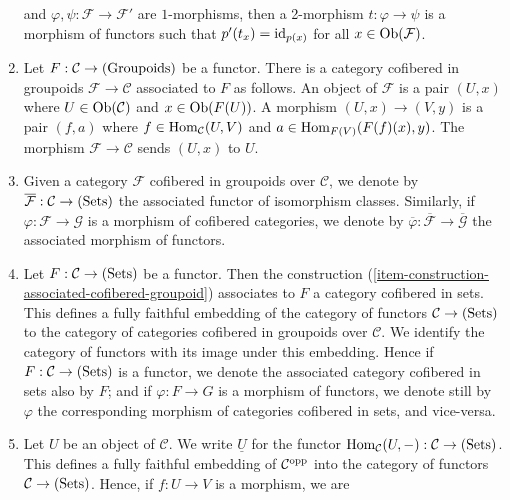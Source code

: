 \begin{remarks}
\begin{enumerate}
and $\varphi, \psi: \mathcal F \rightarrow \mathcal F'$ are $1$-morphisms, then 
a 2-morphism $t: \varphi \rightarrow \psi$ is a morphism of functors such that 
$p'(t_x) = \textnormal{id}_{p(x)}$ for all $x \in \textnormal{Ob}(\mathcal F)$.
\item
\label{item-construction-associated-cofibered-groupoid} 
Let $F: \mathcal C \rightarrow \textnormal{(Groupoids)}$ be a functor.  There 
is a category cofibered in groupoids $\mathcal F \rightarrow \mathcal C$ 
associated to $F$ as follows.  An object of $\mathcal F$ is a pair $(U,x)$ 
where $U \in \textnormal{Ob}(\mathcal C)$ and $x \in \textnormal{Ob}(F(U))$.  A 
morphism $(U,x) \rightarrow (V,y)$ is a pair $(f,a)$ where $f \in 
\textnormal{Hom}_{\mathcal C}(U,V)$ and $a \in 
\textnormal{Hom}_{F(V)}(F(f)(x),y)$.  The morphism $\mathcal F \rightarrow 
\mathcal C$ sends $(U,x)$ to $U$.
\item Given a category $\mathcal F$ cofibered in groupoids over $\mathcal C$, 
we denote by $\overline{\mathcal{F}} : \mathcal C \rightarrow 
\textnormal{(Sets)}$ the associated functor of isomorphism classes. Similarly, 
if $\varphi: \mathcal F \rightarrow \mathcal G$ is a morphism of cofibered 
categories, we denote by $\overline{\varphi}: \overline{\mathcal F} \rightarrow 
\overline{\mathcal G}$ the associated morphism of functors.
\item 
\label{item-convention-cofibered-sets}
Let $F: \mathcal C \rightarrow \textnormal{(Sets)}$ be a functor.  Then the 
construction (\ref{item-construction-associated-cofibered-groupoid})
associates to 
$F$ a category cofibered in sets. This defines a fully faithful embedding of 
the category of functors $\mathcal C \rightarrow \textnormal{(Sets)}$ to the 
category of categories cofibered in groupoids over $\mathcal C$. We identify 
the category of functors with its image under this embedding. Hence if $F: 
\mathcal C \rightarrow \textnormal{(Sets)}$ is a functor, we denote the 
associated category cofibered in sets also by $F$; and if $\varphi: F 
\rightarrow G$ is a morphism of functors, we denote still by $\varphi$ the 
corresponding morphism of categories cofibered in sets, and vice-versa.
\item 
\label{item-definition-yoneda}
Let $U$ be an object of $\mathcal C$.  We write $\underline{U}$ for the functor 
$\textnormal{Hom}_{\mathcal C}(U,-): \mathcal C \rightarrow 
\textnormal{(Sets)}$.  This defines a fully faithful embedding of $\mathcal 
C^{\textnormal{opp}}$ into the category of functors $\mathcal C \rightarrow 
\textnormal{(Sets)}$. Hence, if $f: U \rightarrow V$ is a morphism, we are 

\end{enumerate}
\end{remarks}
